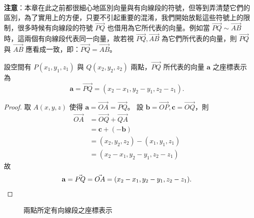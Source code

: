 \textbf{注意}：本章在此之前都很細心地區別向量與有向線段的符號，但等到弄清楚它們的區別，為了實用上的方便，只要不引起重要的混淆，我們開始放鬆這些符號上的限制，很多時候有向線段的符號 $\vec{PQ}$ 也借用為它所代表的向量。例如當 $\vec{PQ} \sim \vec{AB}$ 時，這兩個有向線段代表同一向量，故若視 $\vec{PQ}, \vec{AB}$ 為它們所代表的向量，則 $\vec{PQ}$ 與 $\vec{AB}$ 應看成一致，即：$\vec{PQ} = \vec{AB}$。

\begin{example}[論例 3]
設空間有 $P(x_1, y_1, z_1)$ 與 $Q(x_2, y_2, z_2)$ 兩點，$\vec{PQ}$ 所代表的向量 $\mathbf{a}$ 之座標表示為
\[ \mathbf{a} = \vec{PQ} = (x_2 - x_1, y_2 - y_1, z_2 - z_1). \]
\end{example}

\begin{proof}
取 $A(x, y, z)$ 使得 $\mathbf{a} = \vec{OA} = \vec{PQ}$。
設 $\mathbf{b} = \vec{OP}, \mathbf{c} = \vec{OQ}$，則
\begin{align*}
\vec{OA} &= \vec{OQ} + \vec{QA} \\
&= \mathbf{c} + (-\mathbf{b}) \\
&= (x_2, y_2, z_2) - (x_1, y_1, z_1) \\
&= (x_2 - x_1, y_2 - y_1, z_2 - z_1)
\end{align*}
故
\[ \mathbf{a} = \vec{PQ} = \vec{OA} = (x_2 - x_1, y_2 - y_1, z_2 - z_1). \qedhere \]
\end{proof}

\begin{figure}[H]
\centering
{}
\caption{兩點所定有向線段之座標表示}
\label{fig:b3-fig3-22}
\end{figure}


